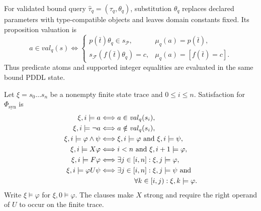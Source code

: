 \begin{definition}
For validated bound query $\widehat\tau_q=(\tau_q,\theta_q)$, substitution
$\theta_q$ replaces declared parameters with type-compatible objects and leaves
domain constants fixed. Its proposition valuation is
\[
a\in\mathit{val}_q(s)
\Longleftrightarrow
\begin{cases}
p(\bar t)\theta_q\in s_{\mathcal P},
  & \mu_q(a)=p(\bar t),\\
s_{\mathcal F}(f(\bar t)\theta_q)=c,
  & \mu_q(a)=[f(\bar t)=c].
\end{cases}
\]
Thus predicate atoms and supported integer equalities are evaluated in the same
bound PDDL state.
\end{definition}

\begin{definition}
Let $\xi=s_0\ldots s_n$ be a nonempty finite state trace and
$0\leq i\leq n$. Satisfaction for $\Phi_{\mathrm{syn}}$ is
\[
\begin{aligned}
\xi,i\models a
  &\Longleftrightarrow a\in\mathit{val}_q(s_i),\\
\xi,i\models\neg a
  &\Longleftrightarrow a\notin\mathit{val}_q(s_i),\\
\xi,i\models\varphi\land\psi
  &\Longleftrightarrow \xi,i\models\varphi\text{ and }\xi,i\models\psi,\\
\xi,i\models X\varphi
  &\Longleftrightarrow i<n\text{ and }\xi,i+1\models\varphi,\\
\xi,i\models F\varphi
  &\Longleftrightarrow \exists j\in[i,n]:\xi,j\models\varphi,\\
\xi,i\models \varphi U\psi
  &\Longleftrightarrow \exists j\in[i,n]:\xi,j\models\psi\text{ and }\\
  &\hspace{4.8em}\forall k\in[i,j):\xi,k\models\varphi.
\end{aligned}
\]
Write $\xi\models\varphi$ for $\xi,0\models\varphi$. The clauses make $X$
strong and require the right operand of $U$ to occur on the finite trace.
\end{definition}

